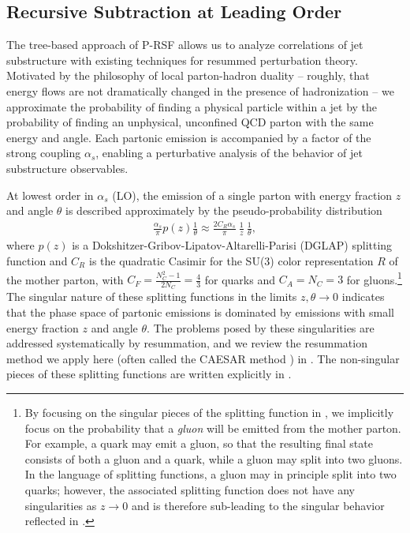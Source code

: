 \subsection{Recursive Subtraction at Leading Order}
\label{app:LO_RSF}

The tree-based approach of P-RSF allows us to analyze correlations of jet substructure with existing techniques for resummed perturbation theory.
%
Motivated by the philosophy of local parton-hadron duality \cite{Azimov:1984np,Andersson:1989ww,Shifman:2003de,Neill:2020tzl} -- roughly, that energy flows are not dramatically changed in the presence of hadronization -- we approximate the probability of finding a physical particle within a jet by the probability of finding an unphysical, unconfined QCD parton with the same energy and angle.
%
Each partonic emission is accompanied by a factor of the strong coupling \(\alpha_s\), enabling a perturbative analysis of the behavior of jet substructure observables.

At lowest order in \(\alpha_s\) (LO), the emission of a single parton with energy fraction \(z\) and angle \(\theta\) is described approximately by the pseudo-probability distribution
\begin{align}
    \frac{\alpha_s}{\pi} p(z) \frac{1}{\theta}
    \approx
    \frac{2 C_R \alpha_s}{\pi}~\frac{1}{z}~\frac{1}{\theta},
    \label{eqn:dglap_approx}
\end{align}
where \(p(z)\) is a Dokshitzer-Gribov-Lipatov-Altarelli-Parisi (DGLAP) splitting function \cite{Gribov:1972ri,Dokshitzer:1977sg,Altarelli:1977zs} and \(C_R\) is the quadratic Casimir for the SU(3) color representation \(R\) of the mother parton, with \(C_F = \frac{N_C^2 - 1}{2 N_C} = \frac{4}{3}\) for quarks and \(C_A = N_C = 3\) for gluons.\footnote{
By focusing on the singular pieces of the splitting function in , we implicitly focus on the probability that a \textit{gluon} will be emitted from the mother parton.
%
For example, a quark may emit a gluon, so that the resulting final state consists of both a gluon and a quark, while a gluon may split into two gluons.
%
In the language of splitting functions, a gluon may in principle split into two quarks;
%
however, the associated splitting function does not have any singularities as \(z \to 0\) and is therefore sub-leading to the singular behavior reflected in .
}
%
The singular nature of these splitting functions in the limits \(z, \theta \to 0\) indicates that the phase space of partonic emissions is dominated by emissions with small energy fraction \(z\) and angle \(\theta\).
%
The problems posed by these singularities are addressed systematically by resummation, and we review the resummation method we apply here (often called the CAESAR method \cite{Banfi:2001bz,Banfi:2004yd}) in .
%
The non-singular pieces of these splitting functions are written explicitly in .

